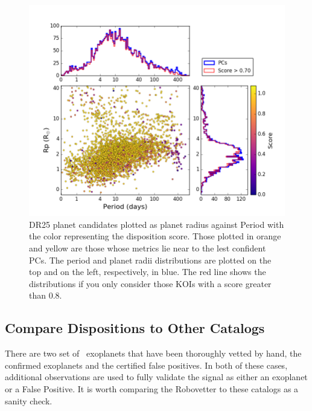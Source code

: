 \begin{figure}
    \centering
    \includegraphics[width=1.1\linewidth]{fig-radiusPeriodScore-hist.png}
    \caption{DR25 planet candidates plotted as planet radius against Period with the color representing the disposition score. Those plotted in orange and yellow are those whose metrics lie near to the lest confident PCs.  The period and planet radii distributions are plotted on the top and on the left, respectively, in blue. The red line shows the distributions if you only consider those KOIs with a score greater than 0.8. }
    \label{f:catalogPlot}
\end{figure}





\subsection{Compare Dispositions to Other Catalogs}
There are two set of \Kepler\ exoplanets that have been thoroughly vetted by hand, the confirmed exoplanets and the certified false positives.  In both of these cases, additional observations are used to fully validate the signal as either an exoplanet or a False Positive.  It is worth comparing the Robovetter to these catalogs as a sanity check.  

